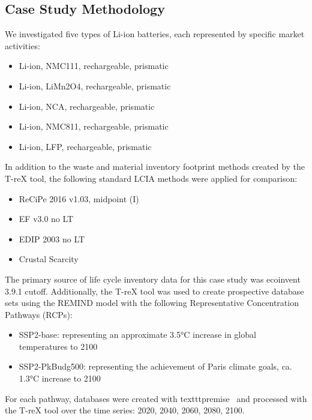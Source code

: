 \subsection{Case Study Methodology}\label{sec:method-case_study}

We investigated five types of Li-ion batteries, each represented by specific market activities:
\begin{itemize}[itemsep=0pt]
    \item Li-ion, NMC111, rechargeable, prismatic
    \item Li-ion, LiMn2O4, rechargeable, prismatic
    \item Li-ion, NCA, rechargeable, prismatic
    \item Li-ion, NMC811, rechargeable, prismatic
    \item Li-ion, LFP, rechargeable, prismatic
\end{itemize}

In addition to the waste and material inventory footprint methods created by the T-reX tool, the following standard LCIA methods were applied for comparison:

\begin{itemize}[itemsep=0pt]
    \item ReCiPe 2016 v1.03, midpoint (I)
    \item EF v3.0 no LT
    \item EDIP 2003 no LT
    \item Crustal Scarcity
\end{itemize}

The primary source of life cycle inventory data for this case study was ecoinvent 3.9.1 cutoff. Additionally, the T-reX tool was used to create prospective database sets using the \mbox{REMIND} model with the following Representative Concentration Pathways (RCPs):
\begin{itemize}
    \item SSP2-base: representing an approximate 3.5°C increase in global temperatures to 2100
    \item SSP2-PkBudg500: representing the achievement of Paris climate goals, ca. 1.3°C increase to 2100
\end{itemize}

For each pathway, databases were created with texttt{premise}~\citep{sacchi2022premise} and processed with the T-reX tool over the time series: 2020, 2040, 2060, 2080, 2100.

